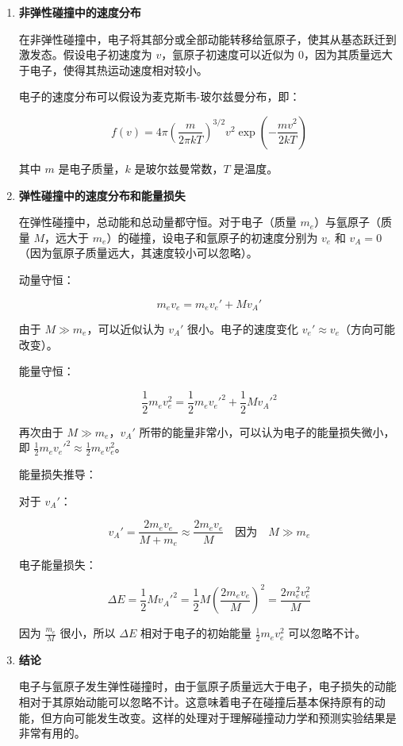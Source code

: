 \documentclass[dvipsnames, svgnames,a4paper,11pt]{article}
\begin{document}
	\begin{enumerate}
		\item \textbf{非弹性碰撞中的速度分布}
		
		在非弹性碰撞中，电子将其部分或全部动能转移给氩原子，使其从基态跃迁到激发态。假设电子初速度为 $v$，氩原子初速度可以近似为 0，因为其质量远大于电子，使得其热运动速度相对较小。
		
		电子的速度分布可以假设为麦克斯韦-玻尔兹曼分布，即：
		
		\[
		f(v) = 4 \pi \left( \frac{m}{2 \pi k T} \right)^{3/2} v^2 \exp\left(-\frac{m v^2}{2 k T}\right)
		\]
		
		其中 $m$ 是电子质量，$k$ 是玻尔兹曼常数，$T$ 是温度。
		
		\item \textbf{弹性碰撞中的速度分布和能量损失}
		
		在弹性碰撞中，总动能和总动量都守恒。对于电子（质量 $m_e$）与氩原子（质量 $M$，远大于 $m_e$）的碰撞，设电子和氩原子的初速度分别为 $v_e$ 和 $v_A = 0$（因为氩原子质量远大，其速度较小可以忽略）。
		
		动量守恒：
		
		\[
		m_e v_e = m_e v_e' + M v_A'
		\]
		
		由于 $M \gg m_e$，可以近似认为 $v_A'$ 很小。电子的速度变化 $v_e' \approx v_e$（方向可能改变）。
		
		能量守恒：
		
		\[
		\frac{1}{2} m_e v_e^2 = \frac{1}{2} m_e v_e'^2 + \frac{1}{2} M v_A'^2
		\]
		
		再次由于 $M \gg m_e$，$v_A'$ 所带的能量非常小，可以认为电子的能量损失微小，即 $\frac{1}{2} m_e v_e'^2 \approx \frac{1}{2} m_e v_e^2$。
		
		能量损失推导：
		
		对于 $v_A'$：
		
		\[
		v_A' = \frac{2 m_e v_e}{M + m_e} \approx \frac{2 m_e v_e}{M} \quad \text{因为} \quad M \gg m_e
		\]
		
		电子能量损失：
		
		\[
		\Delta E = \frac{1}{2} M v_A'^2 = \frac{1}{2} M \left( \frac{2 m_e v_e}{M} \right)^2 = \frac{2 m_e^2 v_e^2}{M}
		\]
		
		因为 $\frac{m_e}{M}$ 很小，所以 $\Delta E$ 相对于电子的初始能量 $\frac{1}{2} m_e v_e^2$ 可以忽略不计。
		
		\item \textbf{结论}
		
		电子与氩原子发生弹性碰撞时，由于氩原子质量远大于电子，电子损失的动能相对于其原始动能可以忽略不计。这意味着电子在碰撞后基本保持原有的动能，但方向可能发生改变。这样的处理对于理解碰撞动力学和预测实验结果是非常有用的。
		
	\end{enumerate}
	
\end{document}
